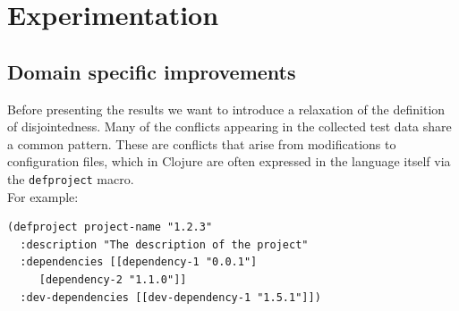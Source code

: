 \documentclass[11pt, titlepage]{article}
\newcommand{\toClojure}[1]{\texttt{#1}\xspace}
\begin{document}
\section{Experimentation}

\subsection{Domain specific improvements}

Before presenting the results we want to introduce a relaxation of the definition of disjointedness. Many of the conflicts appearing in the collected test data share a common pattern. These are conflicts that arise from modifications to configuration files, which in Clojure are often expressed in the language itself via the \toClojure{defproject} macro.
\\
For example:

\begin{verbatim}
(defproject project-name "1.2.3"
  :description "The description of the project"
  :dependencies [[dependency-1 "0.0.1"]
     [dependency-2 "1.1.0"]]
  :dev-dependencies [[dev-dependency-1 "1.5.1"]])
\end{verbatim}
\end{document}
